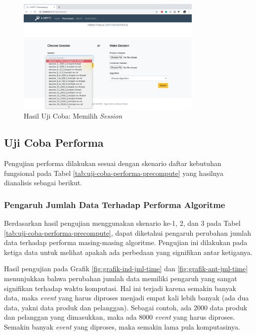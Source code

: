 \begin{figure}[H]
	\centering
	\includegraphics[width=9cm]{assets/img/bab5/hasil7.png}
	\caption{Hasil Uji Coba: Memilih \textit{Session}}
	\label{fig:hasil-performa7}
\end{figure}

\subsection{Uji Coba Performa}
\tab Pengujian performa dilakukan sesuai dengan skenario daftar kebutuhan fungsional pada Tabel \ref{tab:uji-coba-performa-precompute} yang hasilnya dianalisis sebagai berikut. 

\subsubsection{Pengaruh Jumlah Data Terhadap Performa Algoritme}

\tab Berdasarkan hasil pengujian menggunakan skenario ke-1, 2, dan 3 pada Tabel \ref{tab:uji-coba-performa-precompute}, dapat diketahui pengaruh perubahan jumlah data terhadap performa masing-masing algoritme. Pengujian ini dilakukan pada ketiga data untuk melihat apakah ada perbedaan yang signifikan antar ketiganya.

Hasil pengujian pada Grafik \ref{fig:grafik-ind-jml-time} dan \ref{fig:grafik-ant-jml-time} menunjukkan bahwa perubahan jumlah data memiliki pengaruh yang sangat signifikan terhadap waktu komputasi. Hal ini terjadi karena semakin banyak data, maka \textit{event} yang harus diproses menjadi empat kali lebih banyak (ada dua data, yakni data produk dan pelanggan). Sebagai contoh, ada 2000 data produk dan pelanggan yang dimasukkan, maka ada 8000 \textit{event} yang harus diproses. Semakin banyak \textit{event} yang diproses, maka semakin lama pula komputasinya.

